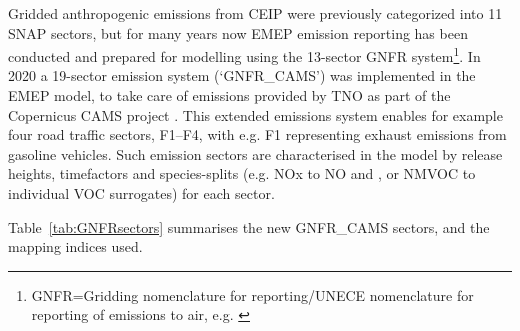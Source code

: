  
Gridded anthropogenic emissions from CEIP
were previously categorized into 11
SNAP sectors, but for many years now EMEP emission reporting has been conducted and prepared for
modelling using the 13-sector
GNFR system\footnote{
GNFR=Gridding nomenclature for reporting/UNECE nomenclature for reporting of emissions to air,
e.g. \citealt{CEIP2020:GNFR}}.
In 2020 a 19-sector emission system (`GNFR\_CAMS') was implemented in the EMEP model, to take care of
emissions provided by TNO as part of the Copernicus CAMS project \citep{Kuenen2021}. This extended emissions system
enables for example four road traffic sectors, F1--F4, with e.g. F1
 representing exhaust emissions from gasoline vehicles.
Such emission sectors are characterised in the model by
release heights, timefactors and species-splits (e.g. NOx to NO and
, or NMVOC to individual VOC surrogates) for each sector.

Table~\ref{tab:GNFRsectors} summarises the new GNFR\_CAMS sectors,
and the mapping indices used.


